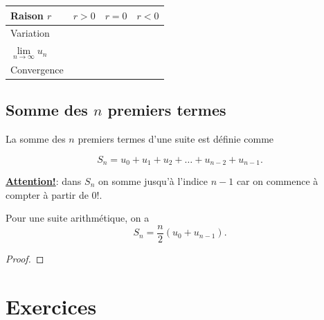 \documentclass[a4paper,12pt]{report}
\begin{document}
\begin{center}
\begin{tabular}{|p{3cm}|p{3cm}|p{3cm}|p{3cm}|}
\hline
Raison \(r\) & \(r>0\) & \(r=0\) & \(r<0\)\\[0pt]
\hline
Variation &  &  & \\[0pt]
\hline
\(\lim\limits_{n\to\infty}u_n\) &  &  & \\[0pt]
\hline
Convergence &  &  & \\[0pt]
\hline
\end{tabular}
\end{center}

\subsection{Somme des \(n\) premiers termes}
\label{sec:org04e2fd4}

La somme des \(n\) premiers termes d'une suite est définie comme

\[
S_n=u_0+u_1+u_2+\ldots+u_{n-2}+u_{n-1}.
\]

\uline{\textbf{Attention!}}: dans \(S_n\) on somme jusqu'à l'indice \(n-1\) car on
commence à compter à partir de \(0\)!.

\begin{propriete}
Pour une suite arithmétique, on a
\[
S_n=\dfrac{n}{2}(u_0+u_{n-1}).
\]
\end{propriete}
\begin{proof}
\dotfill

\dotfill

\dotfill

\dotfill

\dotfill

\dotfill

\dotfill

\dotfill

\dotfill

\dotfill

\dotfill

\dotfill

\dotfill
\end{proof}


\section{Exercices}
\label{sec:org6aa25dc}
\end{document}
